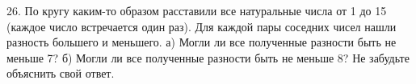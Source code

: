26. По кругу каким-то образом расставили все натуральные числа от 1 до 15 (каждое число встречается один раз). Для каждой пары соседних чисел нашли разность большего и меньшего. а) Могли ли все полученные разности быть не меньше 7? б) Могли ли все полученные разности быть не меньше 8? Не забудьте объяснить свой ответ.\\
